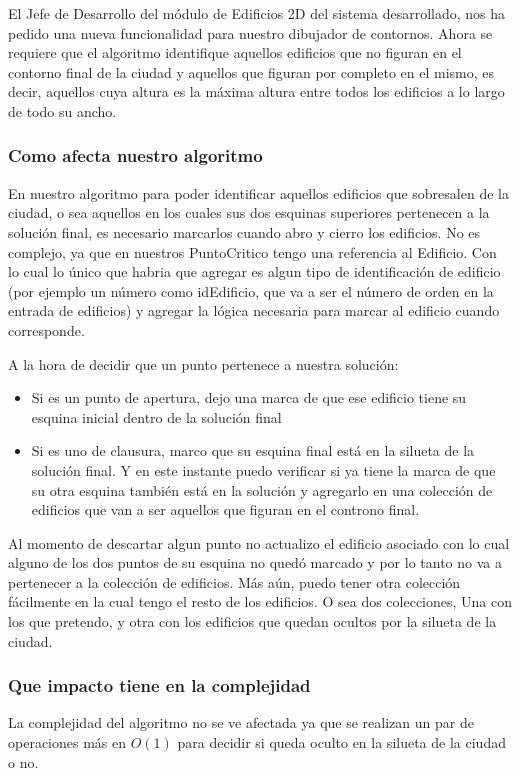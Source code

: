 
El Jefe de Desarrollo del módulo de Edificios 2D del sistema desarrollado, nos ha pedido una nueva funcionalidad para nuestro dibujador de contornos. Ahora se requiere que el algoritmo identifique aquellos edificios que no figuran en el contorno final de la ciudad y aquellos que figuran por completo en el mismo, es decir, aquellos cuya altura es la máxima altura entre todos los edificios a lo largo de todo su ancho.

\subsubsection*{Como afecta nuestro algoritmo}

En nuestro algoritmo para poder identificar aquellos edificios que sobresalen de la ciudad, o sea aquellos en los cuales sus dos esquinas superiores pertenecen a la solución final, es necesario marcarlos cuando abro y cierro los edificios.
No es complejo, ya que en nuestros PuntoCritico tengo una referencia al Edificio. Con lo cual lo único que habria que agregar es algun tipo de identificación de edificio (por ejemplo un número como idEdificio, que va a ser el número de orden en la entrada de edificios) y agregar la lógica necesaria para marcar al edificio cuando corresponde.

A la hora de decidir que un punto pertenece a nuestra solución:
\begin{itemize}
	\item Si es un punto de apertura, dejo una marca de que ese edificio tiene su esquina inicial dentro de la solución final
	\item Si es uno de clausura, marco que su esquina final está en la silueta de la solución final. Y en este instante puedo verificar si ya tiene la marca de que su otra esquina también está en la solución y agregarlo en una colección de edificios que van a ser aquellos que figuran en el controno final.
\end{itemize}

Al momento de descartar algun punto no actualizo el edificio asociado con lo cual alguno de los dos puntos de su esquina no quedó marcado y por lo tanto no va a pertenecer a la colección de edificios. Más aún, puedo tener otra colección fácilmente en la cual tengo el resto de los edificios. O sea dos colecciones, Una con los que pretendo, y otra con los edificios que quedan ocultos por la silueta de la ciudad.


\subsubsection*{Que impacto tiene en la complejidad}

La complejidad del algoritmo no se ve afectada ya que se realizan un par de operaciones más en $O(1)$ para decidir si queda oculto en la silueta de la ciudad o no.